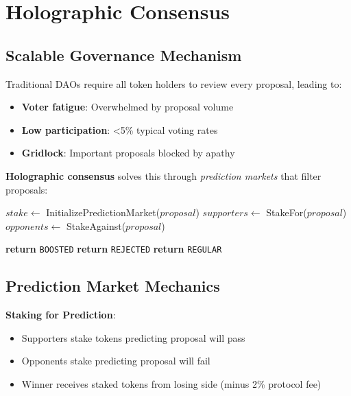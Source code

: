 \section{Holographic Consensus}


\subsection{Scalable Governance Mechanism}

Traditional DAOs require all token holders to review every proposal, leading to:
\begin{itemize}
\item \textbf{Voter fatigue}: Overwhelmed by proposal volume
\item \textbf{Low participation}: <5\% typical voting rates
\item \textbf{Gridlock}: Important proposals blocked by apathy
\end{itemize}

\textbf{Holographic consensus} solves this through \emph{prediction markets} that filter proposals:

\begin{algorithm}[H]
\caption{Holographic Consensus Filtering}
\begin{algorithmic}[1]
    \State $stake \gets$ InitializePredictionMarket($proposal$)
    \State $supporters \gets$ StakeFor($proposal$)
    \State $opponents \gets$ StakeAgainst($proposal$)

        \State \textbf{return} \texttt{BOOSTED} 
        \State \textbf{return} \texttt{REJECTED} 
    \Else
        \State \textbf{return} \texttt{REGULAR} 
    \EndIf
\EndFunction
\end{algorithmic}
\end{algorithm}

\subsection{Prediction Market Mechanics}

\textbf{Staking for Prediction}:
\begin{itemize}
\item Supporters stake tokens predicting proposal will pass
\item Opponents stake predicting proposal will fail
\item Winner receives staked tokens from losing side (minus 2\% protocol fee)
\end{itemize}

